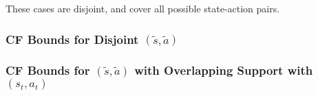 These cases are disjoint, and cover all possible state-action pairs.

\pagebreak


\subsubsection{CF Bounds for Disjoint $(\tilde{s}, \tilde{a})$}



\pagebreak
\subsubsection{CF Bounds for $(\tilde{s}, \tilde{a})$ with Overlapping Support with $(s_t, a_t)$}
